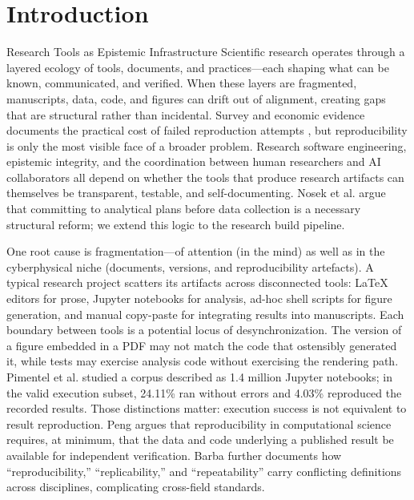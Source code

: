 \documentclass[
  ignorenonframetext,
]{beamer}
\author{\texorpdfstring{}{}}
\date{}
\begin{document}
\section{Introduction}\label{introduction}

\begin{frame}[allowframebreaks]{Research Tools as Epistemic
Infrastructure}
\protect{}\label{research-tools-as-epistemic-infrastructure}
Scientific research operates through a layered ecology of tools,
documents, and practices---each shaping what can be known, communicated,
and verified. When these layers are fragmented, manuscripts, data, code,
and figures can drift out of alignment, creating gaps that are
structural rather than incidental. Survey and economic evidence
documents the practical cost of failed reproduction attempts
, but
reproducibility is only the most visible face of a broader problem.
Research software engineering, epistemic integrity, and the coordination
between human researchers and AI collaborators all depend on whether the
tools that produce research artifacts can themselves be transparent,
testable, and self-documenting. Nosek et al.
 argue that committing to analytical
plans before data collection is a necessary structural reform; we extend
this logic to the research build pipeline.

One root cause is fragmentation---of attention (in the mind) as well as
in the cyberphysical niche (documents, versions, and reproducibility
artefacts). A typical research project scatters its artifacts across
disconnected tools: LaTeX editors  for prose,
Jupyter notebooks for analysis, ad-hoc shell scripts for figure
generation, and manual copy-paste for integrating results into
manuscripts. Each boundary between tools is a potential locus of
desynchronization. The version of a figure embedded in a PDF may not
match the code that ostensibly generated it, while tests may exercise
analysis code without exercising the rendering path. Pimentel et al.
 studied a corpus described as 1.4 million
Jupyter notebooks; in the valid execution subset, 24.11\% ran without
errors and 4.03\% reproduced the recorded results. Those distinctions
matter: execution success is not equivalent to result reproduction. Peng
 argues that reproducibility in computational
science requires, at minimum, that the data and code underlying a
published result be available for independent verification. Barba
 further documents how ``reproducibility,''
``replicability,'' and ``repeatability'' carry conflicting definitions
across disciplines, complicating cross-field standards.
\end{frame}
\end{document}
